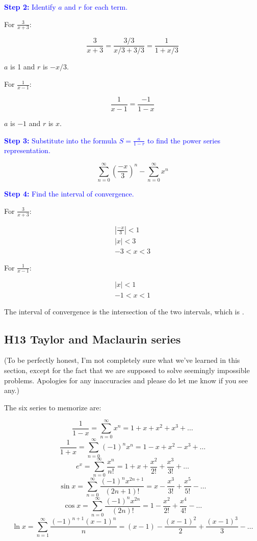 \documentclass[letterpaper, 12pt]{article}
\newcommand{\step}[2]{\textcolor{blue}{\textbf{Step #1:} #2}}
\begin{document}
\step{2}{Identify $a$ and $r$ for each term.}

For $\displaystyle \frac{3}{x+3}$:

$$\frac{3}{x+3} = \frac{3/3}{x/3+3/3} = \frac{1}{1+x/3}$$

$a$ is 1 and $r$ is $-x/3$.

For $\displaystyle \frac{1}{x-1}$:

$$\frac{1}{x-1} = \frac{-1}{1-x}$$

$a$ is $-1$ and $r$ is $x$.

\step{3}{Substitute into the formula $S = \frac{a}{1-r}$ to find the power series representation.}

$$\boxed{\sum_{n=0}^{\infty} \left(\frac{-x}{3}\right)^n - \sum_{n=0}^{\infty} x^n}$$

\step{4}{Find the interval of convergence.}

For $\displaystyle \frac{3}{x+3}$:

\begin{gather*}
\left| \frac{-x}{3} \right| < 1 \\
|x| < 3 \\
-3 < x < 3
\end{gather*}

For $\displaystyle \frac{1}{x-1}$:

\begin{gather*}
|x| < 1 \\
-1 < x < 1
\end{gather*}

The interval of convergence is the intersection of the two intervals, which is .

\subsection*{H13 Taylor and Maclaurin series}

(To be perfectly honest, I'm not completely sure what we've learned in this section, except for the fact that we are supposed to solve seemingly impossible problems. Apologies for any inaccuracies and please do let me know if you see any.)

The six series to memorize are:

$$\frac{1}{1-x} = \sum_{n=0}^{\infty} x^n = 1 + x + x^2 + x^3 + \dots$$
$$\frac{1}{1+x} = \sum_{n=0}^{\infty} (-1)^n x^n = 1 - x + x^2 - x^3 + \dots$$
$$e^x = \sum_{n=0}^\infty \frac{x^n}{n!} = 1 + x + \frac{x^2}{2!} + \frac{x^3}{3!} + \dots$$
$$\sin x = \sum_{n=0}^\infty \frac{(-1)^n x^{2n+1}}{(2n+1)!} = x - \frac{x^3}{3!} + \frac{x^5}{5!} - \dots$$
$$\cos x = \sum_{n=0}^\infty \frac{(-1)^n x^{2n}}{(2n)!} = 1 - \frac{x^2}{2!} + \frac{x^4}{4!} - \dots$$
$$\ln x = \sum_{n=1}^\infty \frac{(-1)^{n+1} (x-1)^n}{n} = (x-1) - \frac{(x-1)^2}{2} + \frac{(x-1)^3}{3} - \dots$$
\end{document}
